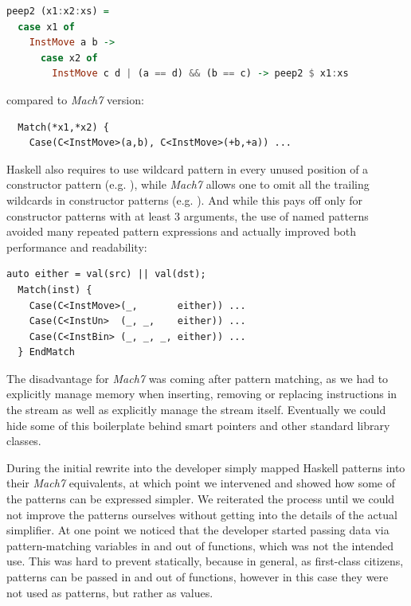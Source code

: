\begin{lstlisting}[language=Haskell]
peep2 (x1:x2:xs) = 
  case x1 of
    InstMove a b -> 
      case x2 of
        InstMove c d | (a == d) && (b == c) -> peep2 $ x1:xs
\end{lstlisting}

\noindent compared to \emph{Mach7} version:

\begin{lstlisting}
  Match(*x1,*x2) {
    Case(C<InstMove>(a,b), C<InstMove>(+b,+a)) ...
\end{lstlisting}

\noindent
Haskell also requires to use wildcard pattern in every unused position of a 
constructor pattern (e.g. ), while \emph{Mach7} 
allows one to omit all the trailing wildcards in constructor patterns (e.g. 
). And while this pays off only for constructor patterns with 
at least 3 arguments, the use of named patterns avoided many repeated pattern 
expressions and actually improved both performance and readability:

\begin{lstlisting}[columns=flexible]
  auto either = val(src) || val(dst);
  Match(inst) {
    Case(C<InstMove>(_,       either)) ...
    Case(C<InstUn>  (_, _,    either)) ...
    Case(C<InstBin> (_, _, _, either)) ...
  } EndMatch
\end{lstlisting}

\noindent
The disadvantage for \emph{Mach7} was coming after pattern matching, as we had to 
explicitly manage memory when inserting, removing or replacing instructions in 
the stream as well as explicitly manage the stream itself. Eventually we could 
hide some of this boilerplate behind smart pointers and other standard library 
classes.

During the initial rewrite into \Cpp{} the developer simply mapped Haskell 
patterns into their \emph{Mach7} equivalents, at which point we intervened and 
showed how some of the patterns can be expressed simpler. We reiterated the 
process until we could not improve the patterns ourselves without getting into 
the details of the actual simplifier. At one point we noticed that the developer 
started passing data via pattern-matching variables  in and out of 
functions, which was not the intended use. This was hard to prevent statically, 
because in general, as first-class citizens, patterns can be passed in and out 
of functions, however in this case they were not used as patterns, but rather as 
values.

